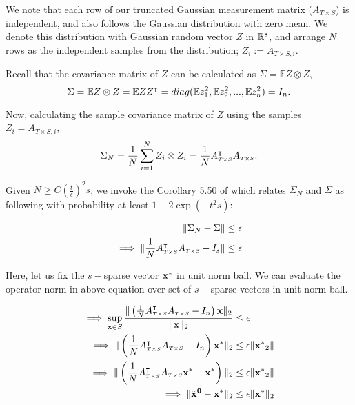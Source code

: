 We note that each row of our truncated Gaussian measurement matrix ($A_{\scriptscriptstyle{T\times S}}$) is independent, and also follows the Gaussian distribution with zero mean.  
We denote this distribution with Gaussian random vector $Z$ in ${\mathbb{R}}^s$, and arrange $N$ rows as the independent samples from the distribution; $Z_i := A_{\scriptscriptstyle{T\times S},i}$. 

Recall that the covariance matrix of $Z$ can be calculated as $\Sigma = \mathbb{E}Z\otimes Z$,
$$
\Sigma= \mathbb{E}Z\otimes Z = \mathbb{E} ZZ^\intercal = diag(\mathbb{E}z_1^2,\mathbb{E}z_2^2,...,\mathbb{E}z_n^2) = I_n.
$$

Now, calculating the sample covariance matrix of $Z$ using the samples $Z_i = A_{\scriptscriptstyle{T\times S},i}$,
$$
\Sigma_N = \frac{1}{N}\sum_{i=1}^{N}Z_i \otimes Z_i = \frac{1}{N} A_{\scriptscriptstyle{T\times S}}^\intercal A_{\scriptscriptstyle{T\times S}}.
$$

Given $N \geq C(\frac{t}{\epsilon})^2s$, we invoke the Corollary 5.50 of \cite{}  which relates $\Sigma_N$ and $\Sigma$ as following with probability at least $1 - 2\exp\left(-t^2s\right)$:

\begin{align*}
\|\Sigma_N - \Sigma\| &\leq \epsilon \\
\implies \|\frac{1}{N} A_{\scriptscriptstyle{T\times S}}^\intercal A_{\scriptscriptstyle{T\times S}} - I_s\| &\leq \epsilon \\
\end{align*}

Here, let us fix the $s-$sparse vector $\mathbf{x^*}$ in unit norm ball. We can evaluate the operator norm in above equation over set of $s-$sparse vectors in unit norm ball.

\begin{align*}
\implies \sup_{\mathbf{x} \in S} \frac{\|\left(\frac{1}{N} A_{\scriptscriptstyle{T\times S}}^\intercal A_{\scriptscriptstyle{T\times S}} - I_n\right)\mathbf{x}\|_2}{\|\mathbf{x}\|_2} &\leq \epsilon \\
\implies \|\left(\frac{1}{N} A_{\scriptscriptstyle{T\times S}}^\intercal A_{\scriptscriptstyle{T\times S}} - I_n\right)\mathbf{x^*}\|_2 &\leq \epsilon \|\mathbf{x^*}_2\| \\
\implies \|\left(\frac{1}{N} A_{\scriptscriptstyle{T\times S}}^\intercal A_{\scriptscriptstyle{T\times S}}\mathbf{x^*} - \mathbf{x^*}\right)\|_2 &\leq \epsilon \|\mathbf{x^*}_2\| \\
\implies \|\mathbf{\tilde{x}^0} - \mathbf{x^*}\|_2 &\leq \epsilon \|\mathbf{x^*}\|_2 \\
\end{align*}

